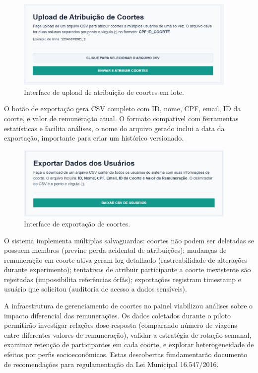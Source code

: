 \begin{figure}[H]
    \centering
    \includegraphics[width=0.95\textwidth]{figuras/upload_coortes.PNG}
    \caption{Interface de upload de atribuição de coortes em lote.}
    \label{fig:coortes_listagem_upload}
  \end{figure}

O botão de exportação gera CSV completo com ID, nome, CPF, email, ID da coorte, e valor de remuneração atual. O formato compatível com ferramentas estatísticas e facilita análises, o nome do arquivo gerado inclui a data da exportação, importante para criar um histórico versionado.

\begin{figure}[H]
    \centering
    \includegraphics[width=0.95\textwidth]{figuras/exportar_coortes.PNG}
    \caption{Interface de exportação de coortes.}
    \label{fig:coortes_listagem_exportar}
  \end{figure}

O sistema implementa múltiplas salvaguardas: coortes não podem ser deletadas se possuem membros (previne perda acidental de atribuições); mudanças de remuneração em coorte ativa geram log detalhado (rastreabilidade de alterações durante experimento); tentativas de atribuir participante a coorte inexistente são rejeitadas (impossibilita referências órfãs); exportações registram timestamp e usuário que solicitou (auditoria de acesso a dados sensíveis).

A infraestrutura de gerenciamento de coortes no painel viabilizou análises sobre o impacto diferencial das remunerações. Os dados coletados durante o piloto permitirão investigar relações dose-resposta (comparando número de viagens entre diferentes valores de remuneração), validar a estratégia de rotação semanal, examinar retenção de participantes em cada coorte, e explorar heterogeneidade de efeitos por perfis socioeconômicos. Estas descobertas fundamentarão documento de recomendações para regulamentação da Lei Municipal 16.547/2016.


